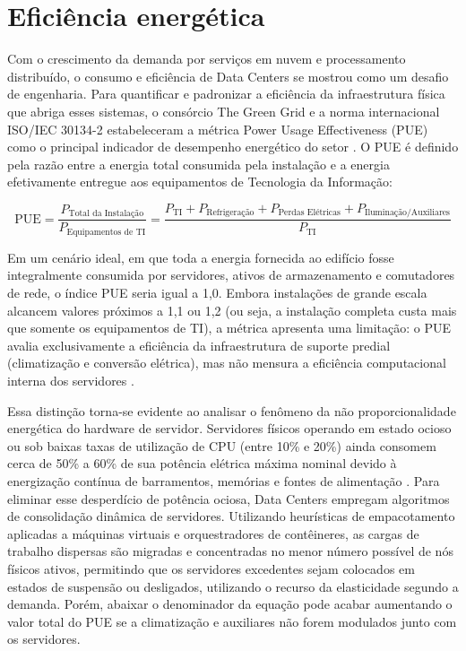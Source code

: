 
\section{Eficiência energética}

Com o crescimento da demanda por serviços em nuvem e processamento distribuído, o consumo e eficiência de Data Centers se mostrou como um desafio de engenharia. Para quantificar e padronizar a eficiência da infraestrutura física que abriga esses sistemas, o consórcio The Green Grid e a norma internacional ISO/IEC 30134-2 estabeleceram a métrica Power Usage Effectiveness (PUE) como o principal indicador de desempenho energético do setor \cite{iso30134pue}. O PUE é definido pela razão entre a energia total consumida pela instalação e a energia efetivamente entregue aos equipamentos de Tecnologia da Informação:

\begin{center}
	\footnotesize
	\begin{equation}
		\text{PUE} = \frac{P_{\text{Total da Instalação}}}{P_{\text{Equipamentos de TI}}} = \frac{P_{\text{TI}} + P_{\text{Refrigeração}} + P_{\text{Perdas Elétricas}} + P_{\text{Iluminação/Auxiliares}}}{P_{\text{TI}}}
	\end{equation}  
\end{center}

Em um cenário ideal, em que toda a energia fornecida ao edifício fosse integralmente consumida por servidores, ativos de armazenamento e comutadores de rede, o índice PUE seria igual a 1,0.
Embora instalações de grande escala alcancem valores próximos a 1,1 ou 1,2 (ou seja, a instalação completa custa mais que somente os equipamentos de TI), a métrica apresenta uma limitação: o PUE avalia exclusivamente a eficiência da infraestrutura de suporte predial (climatização e conversão elétrica), mas não mensura a eficiência computacional interna dos servidores \cite{dayarathna2016data}.

Essa distinção torna-se evidente ao analisar o fenômeno da não proporcionalidade energética do hardware de servidor. Servidores físicos operando em estado ocioso ou sob baixas taxas de utilização de CPU (entre 10\% e 20\%) ainda consomem cerca de 50\% a 60\% de sua potência elétrica máxima nominal devido à energização contínua de barramentos, memórias e fontes de alimentação \cite{beloglazov2012energy}. Para eliminar esse desperdício de potência ociosa, Data Centers empregam algoritmos de consolidação dinâmica de servidores. Utilizando heurísticas de empacotamento aplicadas a máquinas virtuais e orquestradores de contêineres, as cargas de trabalho dispersas são migradas e concentradas no menor número possível de nós físicos ativos, permitindo que os servidores excedentes sejam colocados em estados de suspensão ou desligados, utilizando o recurso da elasticidade segundo a demanda. Porém, abaixar o denominador da equação pode acabar aumentando o valor total do PUE se a climatização e auxiliares não forem modulados junto com os servidores.

